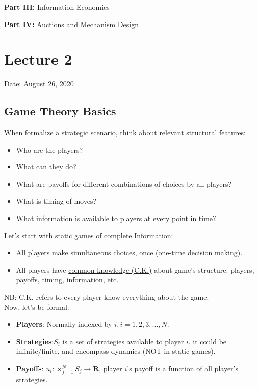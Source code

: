 \documentclass[12pt]{article}
\newcommand{\bb}[1]{{\textbf {#1}}}
\newcommand{\e}[1]{$ #1 $}
\begin{document}
\begin{spacing}{1.5}
            \bb{Part III:} Information Economics

            \bb{Part IV:} Auctions and Mechanism Design\\

    \newpage
    \section{Lecture 2}
        \begin{flushright}
            Date: August 26, 2020    
        \end{flushright}
        

        \subsection{Game Theory Basics}

            When formalize a strategic scenario, think about relevant structural features:

            \begin{itemize}
                \item Who are the players?
                \item What can they do?
                \item What are payoffs for different combinations of choices by all players?
                \item What is timing of moves?
                \item What information is available to players at every point in time?
            \end{itemize}

            Let's start with static games of complete Information:
            
            \begin{itemize}
                \item All players make simultaneous choices, once (one-time decision making).
                \item All players have \underline{common knowledge (C.K.)} about 
                      game's structure: players, payoffs, timing, information, etc.
            \end{itemize}

            NB: C.K. refers to every player know everything about the game.\\

            Now, let's be formal:
            \begin{itemize}
                \item \bb{Players}: Normally indexed by \e{i, i = 1,2,3,...,N}.
                \item \bb{Strategies}:\e{S_i} is a set of strategies available to player \e{i}.
                                        it could be infinite/finite, and encompass dynamics 
                                        (NOT in static games).
                \item \bb{Payoffs}: \e{u_i: \times_{j = 1}^N S_j \rightarrow \bb{R}}, player \e{i}'s payoff is a function
                                    of all player's strategies.
            \end{itemize}
           

\end{spacing}
\end{document}
